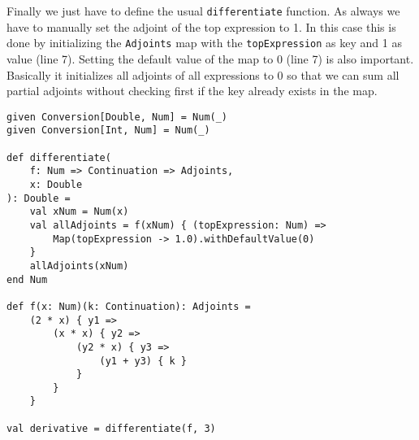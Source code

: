 Finally we just have to define the usual \lstinline{differentiate} function. As always we have to manually set the adjoint of the top expression to 1. In this case this is done by initializing the \lstinline{Adjoints} map with the \lstinline{topExpression} as key and 1 as value (line 7). Setting the default value of the map to 0 (line 7) is also important. Basically it initializes all adjoints of all expressions to 0 so that we can sum all partial adjoints without checking first if the key already exists in the map. 
\begin{lstlisting}
given Conversion[Double, Num] = Num(_)
given Conversion[Int, Num] = Num(_)

def differentiate(
    f: Num => Continuation => Adjoints, 
    x: Double
): Double =
    val xNum = Num(x)
    val allAdjoints = f(xNum) { (topExpression: Num) =>
        Map(topExpression -> 1.0).withDefaultValue(0)
    }
    allAdjoints(xNum)
end Num

def f(x: Num)(k: Continuation): Adjoints =
    (2 * x) { y1 =>
        (x * x) { y2 =>
            (y2 * x) { y3 =>
                (y1 + y3) { k }
            }
        }
    }

val derivative = differentiate(f, 3)
\end{lstlisting}